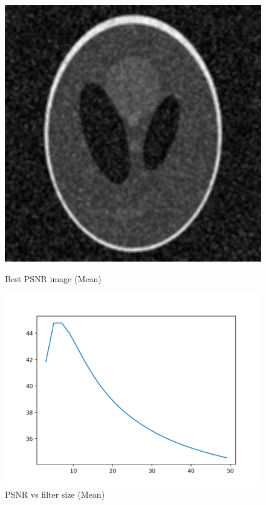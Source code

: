 \documentclass{article}
\begin{document}
    \begin{figure}[!htb]
      \includegraphics[scale=0.3]{./basic_denoising/shepplogan/average_best_sp.png}
      \caption{Best PSNR image (Mean)}
    \endminipage \hfill
      \includegraphics[scale=.45]{./basic_denoising/shepplogan/average_psnr_sp.png}
      \caption{PSNR vs filter size (Mean)}
    \endminipage
    \end{figure}
    
\end{document}
